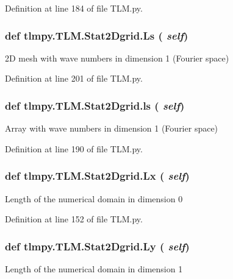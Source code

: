 Definition at line 184 of file TLM.py.\hypertarget{classtlmpy_1_1TLM_1_1Stat2Dgrid_a7e66eef950c5f7dcc8263919873dcff7}{
\subsubsection[{Ls}]{\setlength{\rightskip}{0pt plus 5cm}def tlmpy.TLM.Stat2Dgrid.Ls ( {\em self})}}
\label{classtlmpy_1_1TLM_1_1Stat2Dgrid_a7e66eef950c5f7dcc8263919873dcff7}
\begin{DoxyVerb}2D mesh with wave numbers in dimension 1 (Fourier space)\end{DoxyVerb}
 

Definition at line 201 of file TLM.py.\hypertarget{classtlmpy_1_1TLM_1_1Stat2Dgrid_abd86a500dd7c1aa79ed33e239d93c4ab}{
\subsubsection[{ls}]{\setlength{\rightskip}{0pt plus 5cm}def tlmpy.TLM.Stat2Dgrid.ls ( {\em self})}}
\label{classtlmpy_1_1TLM_1_1Stat2Dgrid_abd86a500dd7c1aa79ed33e239d93c4ab}
\begin{DoxyVerb}Array with wave numbers in dimension 1 (Fourier space)\end{DoxyVerb}
 

Definition at line 190 of file TLM.py.\hypertarget{classtlmpy_1_1TLM_1_1Stat2Dgrid_a2a86df80f6578301f62d8550e47b48a7}{
\subsubsection[{Lx}]{\setlength{\rightskip}{0pt plus 5cm}def tlmpy.TLM.Stat2Dgrid.Lx ( {\em self})}}
\label{classtlmpy_1_1TLM_1_1Stat2Dgrid_a2a86df80f6578301f62d8550e47b48a7}
\begin{DoxyVerb}Length of the numerical domain in dimension 0\end{DoxyVerb}
 

Definition at line 152 of file TLM.py.\hypertarget{classtlmpy_1_1TLM_1_1Stat2Dgrid_a1e410f6a5a42cd8f4a315fe76f23c8cd}{
\subsubsection[{Ly}]{\setlength{\rightskip}{0pt plus 5cm}def tlmpy.TLM.Stat2Dgrid.Ly ( {\em self})}}
\label{classtlmpy_1_1TLM_1_1Stat2Dgrid_a1e410f6a5a42cd8f4a315fe76f23c8cd}
\begin{DoxyVerb}Length of the numerical domain in dimension 1\end{DoxyVerb}
 

